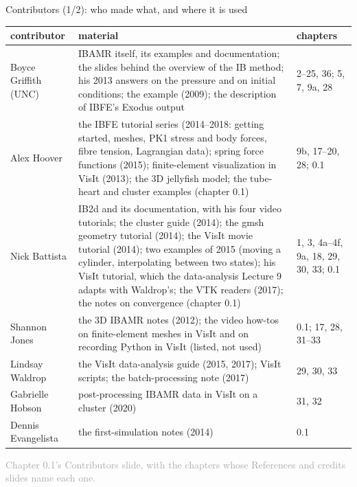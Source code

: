 \documentclass[aspectratio=169,11pt]{beamer}
\newcommand{\sourcecredit}[1]{\vfill\begin{flushright}\tiny\textcolor{DarkGray}{#1}\end{flushright}}
\begin{document}
\begin{frame}{Contributors (1/2): who made what, and where it is used}
\label{fr:people1}
\scriptsize
\renewcommand{\arraystretch}{1.08}
\begin{tabular}{@{}L{0.18\textwidth}L{0.6\textwidth}L{0.16\textwidth}@{}}
\toprule
contributor & material & chapters\\
\midrule
Boyce Griffith (UNC) & IBAMR itself, its examples and documentation; the slides behind the overview of the IB method; his 2013 answers on the pressure and on initial conditions; the  example (2009); the description of IBFE's Exodus output & 2--25, 36; 5, 7, 9a, 28\\
Alex Hoover & the IBFE tutorial series (2014--2018: getting started, meshes, PK1 stress and body forces, fibre tension, Lagrangian data); spring force functions (2015); finite-element visualization in VisIt (2013); the 3D jellyfish model; the tube-heart and cluster examples (chapter 0.1) & 9b, 17--20, 28; 0.1\\
Nick Battista & IB2d and its documentation, with his four video tutorials; the cluster guide (2014); the gmsh geometry tutorial (2014); the VisIt movie tutorial (2014); two examples of 2015 (moving a cylinder, interpolating between two states); his VisIt tutorial, which the data-analysis Lecture 9 adapts with Waldrop's; the VTK readers (2017); the notes on convergence (chapter 0.1) & 1, 3, 4a--4f, 9a, 18, 29, 30, 33; 0.1\\
Shannon Jones & the 3D IBAMR notes (2012); the video how-tos on finite-element meshes in VisIt and on recording Python in VisIt (listed, not used) & 0.1; 17, 28, 31--33\\
Lindsay Waldrop & the VisIt data-analysis guide (2015, 2017); VisIt scripts; the batch-processing note (2017) & 29, 30, 33\\
Gabrielle Hobson & post-processing IBAMR data in VisIt on a cluster (2020) & 31, 32\\
Dennis Evangelista & the first-simulation notes (2014) & 0.1\\
\bottomrule
\end{tabular}
\sourcecredit{Chapter 0.1's Contributors slide, with the chapters whose References and credits slides name each one.}
\end{frame}
\end{document}
